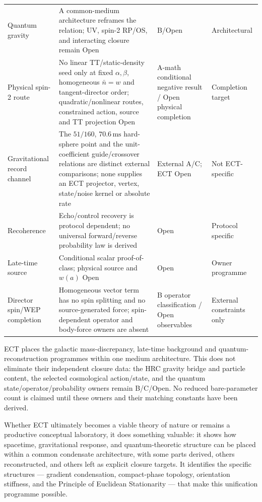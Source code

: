\documentclass[11pt,a4paper]{article}
\begin{document}
\begin{longtable}{@{}p{3.0cm}p{7.0cm}p{2.0cm}p{2.0cm}@{}}
Quantum gravity & A common-medium architecture reframes the relation; UV, spin-2 RP/OS, and interacting closure remain Open & B/Open & Architectural \\
Physical spin-2 route & No linear TT/static-density seed only at fixed $\alpha,\beta$, homogeneous $\bar n=w$ and tangent-director order; quadratic/nonlinear routes, constrained action, source and TT projection Open & A-math conditional negative result / Open physical completion & Completion target \\
Gravitational record channel & The $51/160$, $70.6\,\mathrm{ms}$ hard-sphere point and the unit-coefficient guide/crossover relations are distinct external comparisons; none supplies an ECT projector, vertex, state/noise kernel or absolute rate & External A/C; ECT Open & Not ECT-specific \\
Recoherence & Echo/control recovery is protocol dependent; no universal forward/reverse probability law is derived & Open & Protocol specific \\
Late-time source & Conditional scalar proof-of-class; physical source and $w(a)$ Open & Open & Owner programme \\
Director spin/WEP completion & Homogeneous vector term has no spin splitting and no source-generated force; spin-dependent operator and body-force owners are absent & B operator classification / Open observables & External constraints only \\
\end{longtable}
\normalsize

ECT places the galactic mass-discrepancy, late-time background and quantum-reconstruction programmes within one medium architecture.  This does not eliminate their independent closure data: the HRC gravity bridge and particle content, the selected cosmological action/state, and the quantum state/operator/probability owners remain B/C/Open.  No reduced bare-parameter count is claimed until these owners and their matching constants have been derived.

Whether ECT ultimately becomes a viable theory of nature or remains a productive conceptual laboratory, it does something valuable: it shows how spacetime, gravitational response, and quantum-theoretic structure can be placed within a common condensate architecture, with some parts derived, others reconstructed, and others left as explicit closure targets. It identifies the specific structures --- gradient condensation, compact-phase topology, orientation stiffness, and the Principle of Euclidean Stationarity --- that make this unification programme possible.
\end{document}
